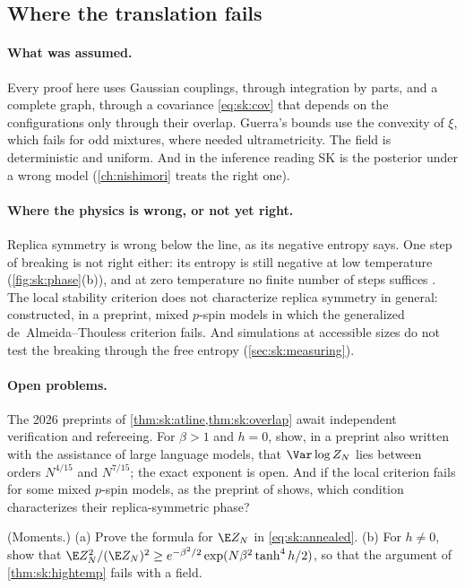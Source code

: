 \begin{refsection}
\section{Where the translation fails}\label{sec:sk:fails}

\paragraph{What was assumed.} Every proof here uses Gaussian couplings, through integration by parts, and a complete graph, through a covariance \eqref{eq:sk:cov} that depends on the configurations only through their overlap. Guerra's bounds use the convexity of $\xi$, which fails for odd mixtures, where \textcite{Panchenko2014} needed ultrametricity. The field is deterministic and uniform. And in the inference reading SK is the posterior under a wrong model (\cref{ch:nishimori} treats the right one).

\paragraph{Where the physics is wrong, or not yet right.} Replica symmetry is wrong below the line, as its negative entropy says. One step of breaking is not right either: its entropy is still negative at low temperature (\cref{fig:sk:phase}(b)), and at zero temperature no finite number of steps suffices \parencite{AuffingerChenZeng2020}. The local stability criterion does not characterize replica symmetry in general: \textcite{MourratSchertzer2026} constructed, in a preprint, mixed $p$-spin models in which the generalized de~Almeida--Thouless criterion fails. And simulations at accessible sizes do not test the breaking through the free entropy (\cref{sec:sk:measuring}).

\paragraph{Open problems.} The 2026 preprints of \cref{thm:sk:atline,thm:sk:overlap} await independent verification and refereeing. For $\beta>1$ and $h=0$, \textcite{AronowLopatto2026a} show, in a preprint also written with the assistance of large language models, that $\Var\log Z_N$ lies between orders $N^{4/15}$ and $N^{7/15}$; the exact exponent is open. And if the local criterion fails for some mixed $p$-spin models, as the preprint of \textcite{MourratSchertzer2026} shows, which condition characterizes their replica-symmetric phase?

\begin{exercises}
\item \consolidation (Moments.) (a) Prove the formula for $\E Z_N$ in \eqref{eq:sk:annealed}. (b) For $h\ne0$, show that $\E Z_N^2/(\E Z_N)^2\ge e^{-\beta^2/2}\exp(N\beta^2\tanh^4h/2)$, so that the argument of \cref{thm:sk:hightemp} fails with a field. \label{ex:sk:moments}


\end{exercises}
\end{refsection}
